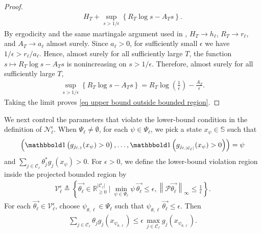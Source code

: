 \documentclass[pdflatex,sn-mathphys-num]{sn-jnl}%
\theoremstyle{thmstyleone}%
\theoremstyle{thmstyletwo}%
\theoremstyle{thmstylethree}%
\begin{document}
\begin{appendices}
\begin{proof}
\begin{align*}
        H_T+\sup_{s>1/\epsilon}\left\{R_T\log s-A_Ts\right\}.
    \end{align*}
    By ergodicity and the same martingale argument used in , $H_T\to h_\ell$, $R_T\to r_\ell$, and $A_T\to a_\ell$ almost surely.
    Since $a_\ell>0$, for sufficiently small $\epsilon$ we have $1/\epsilon>r_\ell/a_\ell$.
    Hence, almost surely for all sufficiently large $T$, the function $s\mapsto R_T\log s-A_Ts$ is nonincreasing on $s>1/\epsilon$.
    Therefore, almost surely for all sufficiently large $T$,
    \begin{align*}
        \sup_{s>1/\epsilon}\left\{R_T\log s-A_Ts\right\}
        = R_T\log\left(\frac{1}{\epsilon}\right)-\frac{A_T}{\epsilon}.
    \end{align*}
    Taking the limit proves \eqref{eq upper bound outside bounded region}.
\end{proof}

We next control the parameters that violate the lower-bound condition in the definition of $\mathcal N_\ell^\epsilon$.
When $\Psi_\ell \neq \emptyset$, for each $\psi\in\Psi_\ell$, we pick a state $x_\psi\in\mathbb S$ such that
\begin{align*}
    \left(
    \mathbbold 1\left(g_{j_{\ell,1}}(x_\psi)>0\right),\dots,
    \mathbbold 1\left(g_{j_{\ell,|\mathcal C_\ell|}}(x_\psi)>0\right)
    \right)=\psi
\end{align*}
and $\sum_{j\in\mathcal C_\ell}\theta_j^*g_j(x_\psi)>0$.
For $\epsilon>0$, we define the lower-bound violation region inside the projected bounded region by
\begin{align*}
    \mathcal V_\ell^\epsilon
    \triangleq
    \left\{\overrightarrow{\theta_\ell}\in\mathbb R_{\geq0}^{|\mathcal C_\ell|}~\Big|~
    \min_{\psi\in\Psi_\ell}\psi\,\overrightarrow{\theta_\ell}\leq\epsilon,
    \left\|\mathcal P\overrightarrow{\theta_\ell}\right\|_\infty\leq\frac{1}{\epsilon}
    \right\}.
\end{align*}
For each $\overrightarrow{\theta_\ell}\in\mathcal V_\ell^\epsilon$, choose $\psi_{\theta,\ell}\in\Psi_\ell$ such that $\psi_{\theta,\ell}\,\overrightarrow{\theta_\ell}\leq\epsilon$.
Then
\begin{align}\label{eq. upper bound of the propensity outside the neighborhood of the actual parameter1}
    \sum_{j\in\mathcal C_\ell}\theta_j g_j(x_{\psi_{\theta,\ell}})
    \leq
    \epsilon\,
    \max_{j\in\mathcal C_\ell}g_j(x_{\psi_{\theta,\ell}}).
\end{align}




\end{appendices}
\end{document}
